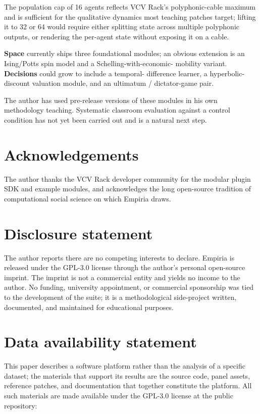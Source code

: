 The population cap of 16 agents reflects VCV Rack's polyphonic-cable
maximum and is sufficient for the qualitative dynamics most teaching
patches target; lifting it to 32 or 64 would require either splitting
state across multiple polyphonic outputs, or rendering the per-agent
state without exposing it on a cable.

\textbf{Space} currently ships three foundational modules; an obvious
extension is an Ising/Potts spin model and a Schelling-with-economic-
mobility variant. \textbf{Decisions} could grow to include a temporal-
difference learner, a hyperbolic-discount valuation module, and an
ultimatum / dictator-game pair.

The author has used pre-release versions of these modules in his own
methodology teaching. Systematic classroom evaluation against a control
condition has not yet been carried out and is a natural next step.

\section{Acknowledgements}\label{acknowledgements}

The author thanks the VCV Rack developer community for the modular
plugin SDK and example modules, and acknowledges the long open-source
tradition of computational social science on which Empiria draws.

\section{Disclosure statement}\label{disclosure-statement}

The author reports there are no competing interests to declare. Empiria
is released under the GPL-3.0 license through the author's personal
open-source imprint. The imprint is not a commercial entity and yields
no income to the author. No funding, university appointment, or
commercial sponsorship was tied to the development of the suite; it is a
methodological side-project written, documented, and maintained for
educational purposes.

\section{Data availability statement}\label{data-availability-statement}

This paper describes a software platform rather than the analysis of a
specific dataset; the materials that support its results are the source
code, panel assets, reference patches, and documentation that together
constitute the platform. All such materials are made available under the
GPL-3.0 license at the public repository:


